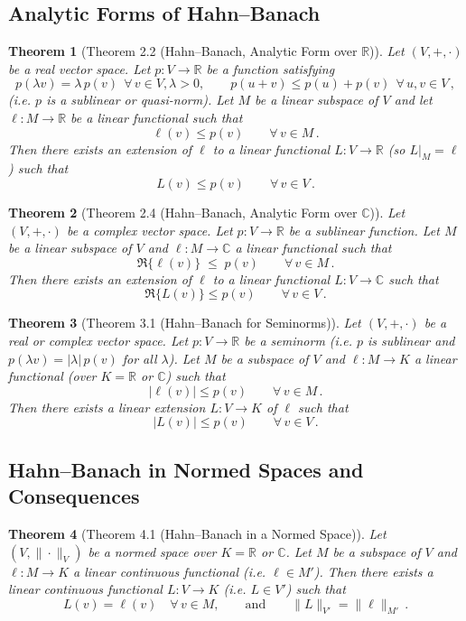 \documentclass{article}
\theoremstyle{plain}
\newtheorem*{theorem*}{Theorem}
\begin{document}
\subsection*{Analytic Forms of Hahn–Banach}
\begin{theorem*}[Theorem 2.2 (Hahn–Banach, Analytic Form over $\mathbb{R}$)]
Let $(V,+,\cdot)$ be a real vector space. Let $p: V \to \mathbb{R}$ be a function satisfying 
\[ 
p(\lambda v) = \lambda\,p(v)\ \ \forall\,v\in V, \lambda>0, 
\qquad 
p(u+v) \le p(u)+p(v)\ \ \forall\,u,v\in V\,,
\] 
(i.e. $p$ is a sublinear or quasi-norm). Let $M$ be a linear subspace of $V$ and let $\ell: M \to \mathbb{R}$ be a linear functional such that 
\[ 
\ell(v) \le p(v) \qquad \forall\,v \in M\,.
\] 
Then there exists an extension of $\ell$ to a linear functional $L: V \to \mathbb{R}$ (so $L|_M = \ell$) such that 
\[ 
L(v) \le p(v) \qquad \forall\,v \in V\,.
\]
\end{theorem*}

\begin{theorem*}[Theorem 2.4 (Hahn–Banach, Analytic Form over $\mathbb{C}$)]
Let $(V,+,\cdot)$ be a complex vector space. Let $p: V \to \mathbb{R}$ be a sublinear function. Let $M$ be a linear subspace of $V$ and $\ell: M \to \mathbb{C}$ a linear functional such that 
\[ 
\Re\{\ell(v)\} \;\le\; p(v) \qquad \forall\,v \in M\,.
\] 
Then there exists an extension of $\ell$ to a linear functional $L: V \to \mathbb{C}$ such that 
\[ 
\Re\{L(v)\} \le p(v)\qquad \forall\,v \in V\,.
\]
\end{theorem*}

\begin{theorem*}[Theorem 3.1 (Hahn–Banach for Seminorms)]
Let $(V,+,\cdot)$ be a real or complex vector space. Let $p: V \to \mathbb{R}$ be a seminorm (i.e. $p$ is sublinear and $p(\lambda v) = |\lambda|\,p(v)$ for all $\lambda$). Let $M$ be a subspace of $V$ and $\ell: M \to K$ a linear functional (over $K=\mathbb{R}$ or $\mathbb{C}$) such that 
\[ 
|\ell(v)| \le p(v)\qquad \forall\,v \in M\,.
\] 
Then there exists a linear extension $L: V \to K$ of $\ell$ such that 
\[ 
|L(v)| \le p(v)\qquad \forall\,v \in V\,.
\] 
\end{theorem*}

\subsection*{Hahn–Banach in Normed Spaces and Consequences}
\begin{theorem*}[Theorem 4.1 (Hahn–Banach in a Normed Space)]
Let $(V,\|\cdot\|_V)$ be a normed space over $K=\mathbb{R}$ or $\mathbb{C}$. Let $M$ be a subspace of $V$ and $\ell: M \to K$ a linear continuous functional (i.e. $\ell \in M'$). Then there exists a linear continuous functional $L: V \to K$ (i.e. $L \in V'$) such that 
\[ 
L(v) = \ell(v)\quad \forall\,v \in M, \qquad \text{and}\qquad \|L\|_{V'} = \|\ell\|_{M'}\,.
\] 
\end{theorem*}
\end{document}
